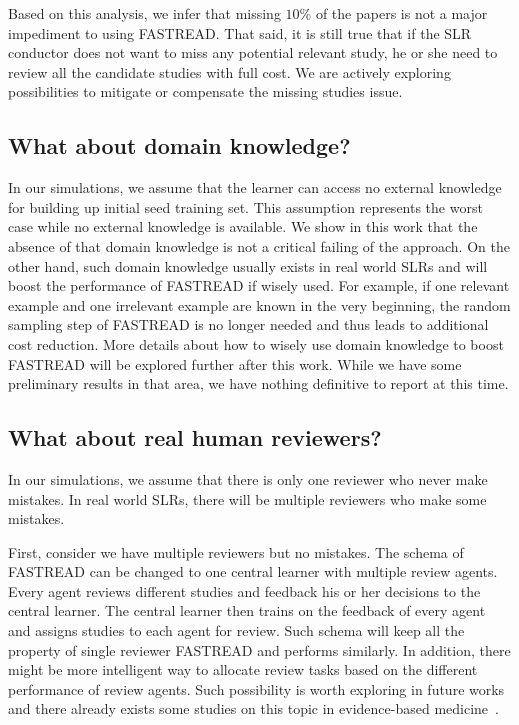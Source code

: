 \documentclass[final,twocolumn,5p]{elsarticle}
\theoremstyle{break}
\begin{document}
Based on this analysis, we infer that missing  $10\%$ of the papers is not a major impediment to using FASTREAD. That said,  it is still true that if the SLR conductor does not want to miss any potential relevant study, he or she need to review all the candidate studies with full cost. We are actively exploring possibilities to mitigate or compensate the missing studies issue. 


 

\subsection{What about domain knowledge?}

In our simulations, we assume that the learner can access no external knowledge for building up initial seed training set. This assumption represents the worst case while no external knowledge is available. We show in this work that the absence of that domain knowledge is not a critical failing of the approach. On the other hand, such domain knowledge usually exists in real world SLRs and will boost the performance of FASTREAD if wisely used. For example, if one relevant example and one irrelevant example are known in the very beginning, the random sampling step of FASTREAD is no longer needed and thus leads to additional cost reduction. More details about how to wisely use domain knowledge to boost FASTREAD will be explored further after this work. While we have some preliminary results in that area, we have nothing definitive to report at this time.

\subsection{What about real human reviewers?}

In our simulations, we assume that there is only one reviewer who never make mistakes. In real world SLRs, there will be multiple reviewers who make some mistakes. 

First, consider we have multiple reviewers but no mistakes. The schema of FASTREAD can be changed to one central learner with multiple review agents. Every agent reviews different studies and feedback his or her decisions to the central learner. The central learner then trains on the feedback of every agent and assigns studies to each agent for review. Such schema will keep all the property of single reviewer FASTREAD and performs similarly. In addition, there might be more intelligent way to allocate review tasks based on the different performance of review agents. Such possibility is worth exploring in future works and there already exists some studies on this topic in evidence-based medicine~\cite{wallace2011should}.
\end{document}
